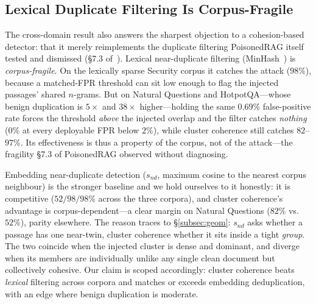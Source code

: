 \documentclass[10pt,journal,compsoc]{IEEEtran}
\begin{document}
\subsection{Lexical Duplicate Filtering Is Corpus-Fragile}
\label{subsec:lex}
The cross-domain result also answers the sharpest objection to a cohesion-based detector: that
it merely reimplements the duplicate filtering PoisonedRAG itself tested and dismissed
(\S7.3 of~\cite{poisonedrag}). Lexical near-duplicate filtering (MinHash~\cite{minhash}) is \emph{corpus-fragile}. On the lexically
sparse Security corpus it catches the attack ($98\%$), because a matched-FPR threshold can sit
low enough to flag the injected passages' shared $n$-grams. But on Natural Questions and
HotpotQA---whose benign duplication is $5\times$ and $38\times$ higher---holding the same
$0.69\%$ false-positive rate forces the threshold \emph{above} the injected overlap and the
filter catches \emph{nothing} ($0\%$ at every deployable FPR below $2\%$), while cluster
coherence still catches $82$--$97\%$. Its effectiveness is thus a property of the corpus, not of
the attack---the fragility \S7.3 of PoisonedRAG observed without diagnosing.

Embedding near-duplicate detection ($s_{nd}$, maximum cosine to the nearest corpus neighbour) is
the stronger baseline and we hold ourselves to it honestly: it is competitive ($52/98/98\%$
across the three corpora), and cluster coherence's advantage is corpus-dependent---a clear
margin on Natural Questions ($82\%$ vs.\ $52\%$), parity elsewhere. The reason traces to
\S\ref{subsec:geom}: $s_{nd}$ asks whether a passage has one near-twin, cluster coherence
whether it sits inside a tight \emph{group}. The two coincide when the injected cluster is dense
and dominant, and diverge when its members are individually unlike any single clean document but
collectively cohesive. Our claim is scoped accordingly: cluster coherence beats \emph{lexical}
filtering across corpora and matches or exceeds embedding deduplication, with an edge where
benign duplication is moderate.
\end{document}

